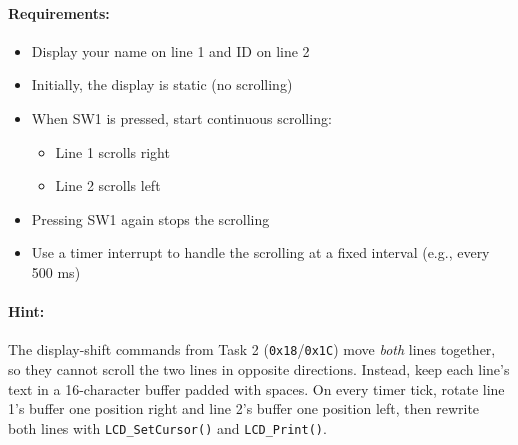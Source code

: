 \paragraph{Requirements:}
\begin{itemize}[nosep]
  \item Display your name on line 1 and ID on line 2
  \item Initially, the display is static (no scrolling)
  \item When SW1 is pressed, start continuous scrolling:
    \begin{itemize}[nosep]
      \item Line 1 scrolls right
      \item Line 2 scrolls left
    \end{itemize}
  \item Pressing SW1 again stops the scrolling
  \item Use a timer interrupt to handle the scrolling at a fixed interval (e.g., every 500 ms)
\end{itemize}

\paragraph{Hint:}
The display-shift commands from Task 2 (\texttt{0x18}/\texttt{0x1C}) move \emph{both} lines together, so they cannot scroll the two lines in opposite directions. Instead, keep each line's text in a 16-character buffer padded with spaces. On every timer tick, rotate line 1's buffer one position right and line 2's buffer one position left, then rewrite both lines with \texttt{LCD\_SetCursor()} and \texttt{LCD\_Print()}.

  